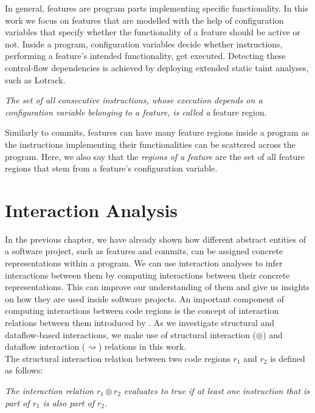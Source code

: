 In general, features are program parts implementing specific functionality.
In this work we focus on features that are modelled with the help of configuration variables that specify whether the functionality of a feature should be active or not.
Inside a program, configuration variables decide whether instructions, performing a feature's intended functionality, get executed. 
Detecting these control-flow dependencies is achieved by deploying extended static taint analyses, such as Lotrack\cite{lillack2014tracking}.

\begin{definition}\label{def:feature_regions}
	\emph{The set of all consecutive instructions, whose execution depends on a configuration variable belonging to a feature, is called a} feature region. 
\end{definition}

Similarly to commits, features can have many feature regions inside a program
as the instructions implementing their functionalities can be scattered across the program.
Here, we also say that the \emph{regions of a feature} are the set of all feature regions that stem from a feature's configuration variable. 

\section{Interaction Analysis}\label{sec:interaction_analysis}

In the previous chapter, we have already shown how different abstract entities of a software project, such as features and commits, can be assigned concrete representations within a program.
We can use interaction analyses to infer interactions between them by computing interactions between their concrete representations.
This can improve our understanding of them and give us insights on how they are used inside software projects. 
An important component of computing interactions between code regions is the concept of interaction relations between them introduced by \citet{sattler2023thesis}.
As we investigate structural and dataflow-based interactions, we make use of structural interaction ($\circledcirc$) and dataflow interaction ($\rightsquigarrow$) relations in this work. \\
The structural interaction relation between two code regions $r_1$ and $r_2$ is defined as follows:

\begin{definition}\label{def:structural_relation}
	\emph{The interaction relation $r_1 \circledcirc r_2$ evaluates to true if at least one instruction that is part of $r_1$
	is also part of $r_2$.}
\end{definition}

